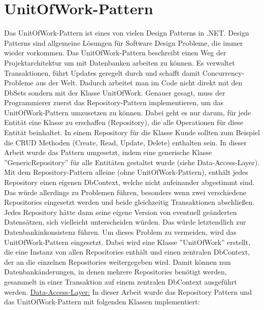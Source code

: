 \section{UnitOfWork-Pattern}
Das UnitOfWork-Pattern ist eines von vielen Design Patterns in .NET. Design Patterns sind allgemeine Lösungen für Software Design Probleme, die immer wieder vorkommen. Das UnitOfWork-Pattern beschreibt einen Weg der Projektarchitektur um mit Datenbanken arbeiten zu können. Es verwaltet Transaktionen, führt Updates geregelt durch und schafft damit Concurrency-Probleme aus der Welt. Dadurch arbeitet man im Code nicht direkt mit den DbSets sondern mit der Klasse UnitOfWork. \newline Genauer gesagt, muss der Programmierer zuerst das Repository-Pattern implementieren, um das UnitOfWork-Pattern umzusetzen zu können. Dabei geht es nur darum, für jede Entität eine Klasse zu erschaffen (Repository), die alle Operationen für diese Entität beinhaltet. In einem Repository für die Klasse Kunde sollten zum Beispiel die CRUD Methoden (Create, Read, Update, Delete) enthalten sein. In dieser Arbeit wurde das Pattern umgesetzt, indem eine generische Klasse ''GenericRepository'' für alle Entitäten gestaltet wurde (siehe Data-Access-Layer). 
\newline Mit dem Repository-Pattern alleine (ohne UnitOfWork-Pattern), enthält jedes Repository einen eigenen DbContext, welche nicht aufeinander abgestimmt sind. Das würde allerdings zu Problemen führen, besonders wenn zwei verschiedene Repositories eingesetzt werden und beide gleichzeitig Transaktionen abschließen. Jedes Repository hätte dann seine eigene Version von eventuell geänderten Datensätzen, sich vielleicht unterscheiden würden. Das würde letztendlich zur Datenbankinkonsistenz führen.
\newline Um dieses Problem zu vermeiden, wird das UnitOfWork-Pattern eingesetzt. Dabei wird eine Klasse ''UnitOfWork'' erstellt, die eine Instanz von allen Repositories enthält und einen zentralen DbContext, der an die einzelnen Repositories weitergegeben wird. Damit können nun Datenbankänderungen, in denen mehrere Repositories benötigt werden, gesammelt in 
einer Transaktion auf einem zentralen DbContext ausgeführt werden.
\newline
\newline
\underline{Data-Access-Layer:}
In dieser Arbeit wurde das Repository Pattern und das UnitOfWork-Pattern mit folgenden Klassen implementiert:
